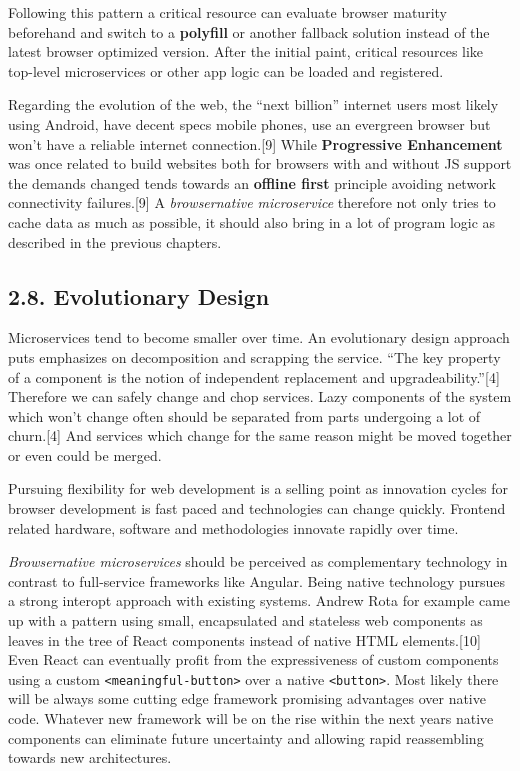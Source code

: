 \documentclass[]{article}
\begin{document}
Following this pattern a critical resource can evaluate browser maturity
beforehand and switch to a \textbf{polyfill} or another fallback
solution instead of the latest browser optimized version. After the
initial paint, critical resources like top-level microservices or other
app logic can be loaded and registered.

Regarding the evolution of the web, the ``next billion'' internet users
most likely using Android, have decent specs mobile phones, use an
evergreen browser but won't have a reliable internet connection.{[}9{]}
While \textbf{Progressive Enhancement} was once related to build
websites both for browsers with and without JS support the demands
changed tends towards an \textbf{offline first} principle avoiding
network connectivity failures.{[}9{]} A \emph{browsernative
microservice} therefore not only tries to cache data as much as
possible, it should also bring in a lot of program logic as described in
the previous chapters.

\subsection{2.8. Evolutionary Design}\label{evolutionary-design}

Microservices tend to become smaller over time. An evolutionary design
approach puts emphasizes on decomposition and scrapping the service.
``The key property of a component is the notion of independent
replacement and upgradeability.''{[}4{]} Therefore we can safely change
and chop services. Lazy components of the system which won't change
often should be separated from parts undergoing a lot of churn.{[}4{]}
And services which change for the same reason might be moved together or
even could be merged.

Pursuing flexibility for web development is a selling point as
innovation cycles for browser development is fast paced and technologies
can change quickly. Frontend related hardware, software and
methodologies innovate rapidly over time.

\emph{Browsernative microservices} should be perceived as complementary
technology in contrast to full-service frameworks like Angular. Being
native technology pursues a strong interopt approach with existing
systems. Andrew Rota for example came up with a pattern using small,
encapsulated and stateless web components as leaves in the tree of React
components instead of native HTML elements.{[}10{]} Even React can
eventually profit from the expressiveness of custom components using a
custom \texttt{\textless{}meaningful-button\textgreater{}} over a native
\texttt{\textless{}button\textgreater{}}. Most likely there will be
always some cutting edge framework promising advantages over native
code. Whatever new framework will be on the rise within the next years
native components can eliminate future uncertainty and allowing rapid
reassembling towards new architectures.
\end{document}
